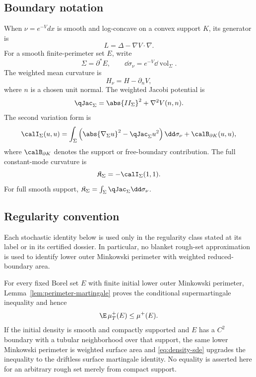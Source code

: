 \documentclass[../../main.tex]{subfiles}
\begin{document}
\subsection{Boundary notation}

When $\nu=e^{-V}dx$ is smooth and log-concave on a convex support $K$, its generator is
\[
  L=\Delta-\nabla V\cdot\nabla.
\]
For a smooth finite-perimeter set $E$, write
\[
  \Sigma=\partial^*E,
  \qquad
  \dd\sigma_\nu=e^{-V}\dd\operatorname{vol}_\Sigma.
\]
The weighted mean curvature is
\[
  H_\nu=H-\partial_nV,
\]
where $n$ is a chosen unit normal. The weighted Jacobi potential is
\[
  \qJac_\Sigma=\abs{II_\Sigma}^2+\nabla^2V(n,n).
\]
The second variation form is
\begin{equation}\label{eq:jacobi-form}
  \calI_\Sigma(u,u)
  =\int_\Sigma\left(\abs{\nabla_\Sigma u}^2-\qJac_\Sigma u^2\right)\dd\sigma_\nu
  +\calB_{\partial K}(u,u),
\end{equation}
where $\calB_{\partial K}$ denotes the support or free-boundary contribution. The full
constant-mode curvature is
\begin{equation}\label{eq:constant-mode-K}
  \mathfrak K_\Sigma=-\calI_\Sigma(1,1).
\end{equation}
For full smooth support, $\mathfrak K_\Sigma=\int_\Sigma\qJac_\Sigma\dd\sigma_\nu$.

\subsection{Regularity convention}

Each stochastic identity below is used only in the regularity class stated at its label or in its
certified dossier. In particular, no blanket rough-set approximation is used to identify lower
outer Minkowski perimeter with weighted reduced-boundary area.

For every fixed Borel set $E$ with finite initial lower outer Minkowski perimeter,
Lemma~\ref{lem:perimeter-martingale} proves the conditional supermartingale inequality and hence
\begin{equation}\label{eq:perimeter-supermartingale}
  \E\,\mu_T^+(E)\le\mu^+(E).
\end{equation}
If the initial density is smooth and compactly supported and $E$ has a $C^2$ boundary with a
tubular neighborhood over that support, the same lower Minkowski perimeter is weighted surface
area and \eqref{eq:density-sde} upgrades the inequality to the driftless surface martingale
identity. No equality is asserted here for an arbitrary rough set merely from compact support.
\end{document}
